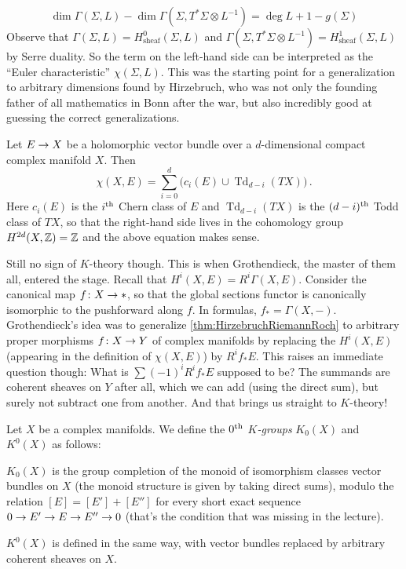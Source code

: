 \documentclass[a4paper, 10pt, oneside, DIV=9, chapterprefix=true, numbers=enddot,bibliography=totoc]{scrbook}
\begin{document}
	\begin{equation*}
		\dim\Gamma(\Sigma,L)-\dim \Gamma\left(\Sigma,T^*\Sigma\otimes L^{-1}\right)=\deg L+1-g(\Sigma)
	\end{equation*}
	Observe that $\Gamma(\Sigma,L)=H_\mathrm{sheaf}^0(\Sigma,L)$ and $\Gamma(\Sigma,T^*\Sigma\otimes L^{-1})=H_\mathrm{sheaf}^1(\Sigma,L)$ by Serre duality. So the term on the left-hand side can be interpreted as the \enquote{Euler characteristic} $\chi(\Sigma,L)$. This was the starting point for a generalization to arbitrary dimensions found by Hirzebruch, who was not only the founding father of all mathematics in Bonn after the war, but also incredibly good at guessing the correct generalizations.
	\begin{thm}\label{thm:HirzebruchRiemannRoch}
		Let $E\morphism X$ be a holomorphic vector bundle over a $d$-dimensional compact complex manifold $X$. Then
		\begin{equation*}
			\chi(X,E)=\sum_{i=0}^d\big(c_i(E)\cup \operatorname{Td}_{d-i}(TX)\big)\,.
		\end{equation*}
		Here $c_i(E)$ is the $i^{\text{th}}$ Chern class of $E$ and $\operatorname{Td}_{d-i}(TX)$ is the $(d-i)^{\text{th}}$ Todd class of $TX$, so that the right-hand side lives in the cohomology group $H^{2d}(X,\mathbb{Z})=\mathbb{Z}$ and the above equation makes sense.
	\end{thm}
	Still no sign of $K$-theory though. This is when Grothendieck, the master of them all, entered the stage. 
	Recall that $H^i(X,E)=R^i\Gamma(X,E)$. Consider the canonical map $f\colon X\morphism *$, so that the global sections functor is canonically isomorphic to the pushforward along $f$. In formulas,  $f_*=\Gamma(X,-)$. Grothendieck's idea was to generalize \cref{thm:HirzebruchRiemannRoch} to arbitrary proper morphisms $f\colon X\morphism Y$ of complex manifolds by replacing the $H^i(X,E)$ (appearing in the definition of $\chi(X,E)$) by $R^if_*E$. This raises an immediate question though: What is $\sum(-1)^iR^if_*E$ supposed to be? The summands are coherent sheaves on $Y$ after all, which we can add (using the direct sum), but surely not subtract one from another. And that brings us straight to $K$-theory!
	\begin{defi}\label{def:K0X}
		Let $X$ be a complex manifolds. We define the \emph{$0^{\text{th}}$ $K$-groups} $K_0(X)$ and $K^0(X)$ as follows:
		\begin{alphanumerate}
			\item $K_0(X)$ is the group completion of the monoid of isomorphism classes vector bundles on $X$ (the monoid structure is given by taking direct sums), modulo the relation $[E]=[E']+[E'']$ for every short exact sequence $0\morphism E'\morphism E\morphism E''\morphism 0$ (that's the condition that was missing in the lecture).
			\item $K^0(X)$ is defined in the same way, with vector bundles replaced by arbitrary coherent sheaves on $X$.
		\end{alphanumerate}
	\end{defi}
\end{document}
